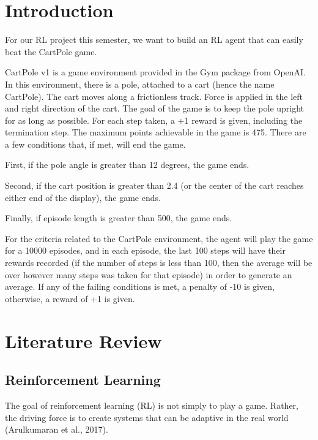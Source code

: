 \documentclass[nohyperref]{article}
\theoremstyle{plain}
\theoremstyle{definition}
\theoremstyle{remark}
\begin{document}

\section{Introduction}

For our RL project this semester, we want to build an RL agent that can easily beat the CartPole game.  

CartPole v1 is a game environment provided in the Gym package from OpenAI. In this environment, there is a pole, attached to a cart (hence the name CartPole). The cart moves along a frictionless track. Force is applied in the left and right direction of the cart.
The goal of the game is to keep the pole upright for as long as possible. For each step taken, a +1 reward is given, including the termination step. The maximum points achievable in the game is 475. There are a few conditions that, if met, will end the game.

First, if the pole angle is greater than 12 degrees, the game ends.

Second, if the cart position is greater than 2.4 (or the center of the cart reaches either end of the display), the game ends.

Finally, if episode length is greater than 500, the game ends.

For the criteria related to the CartPole environment, the agent will play the game for a 10000 episodes, and in each episode, the last 100 steps will have their rewards recorded (if the number of steps is less than 100, then the average will be over however many steps was taken for that episode) in order to generate an average.
If any of the failing conditions is met, a penalty of -10 is given, otherwise, a reward of +1 is given.
\section{Literature Review}

\subsection{Reinforcement Learning}
The goal of reinforcement learning (RL) is not simply to play a game. Rather, the driving force is to create systems that can be adaptive in the real world (Arulkumaran et al., 2017).
\end{document}
